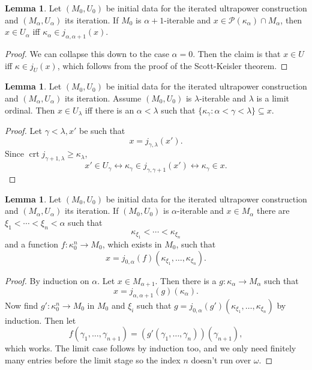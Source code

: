 \documentclass[12pt]{report}
\newcommand{\pset}{\mathcal{P}}
\renewcommand{\iff}{\leftrightarrow}
\DeclareMathOperator{\crt}{crt}
\theoremstyle{definition}
\newtheorem{lemma}[theorem]{Lemma}
\begin{document}
\begin{lemma}
Let $(M_0, U_0)$ be initial data for the iterated ultrapower construction and $(M_\alpha, U_\alpha)$ its iteration.
If $M_0$ is $\alpha + 1$-iterable and $x \in \pset(\kappa_\alpha) \cap M_\alpha$, then $x \in U_\alpha$ iff $\kappa_\alpha \in j_{\alpha,\alpha+1}(x)$.
\end{lemma}
\begin{proof}
We can collapse this down to the case $\alpha = 0$. Then the claim is that $x \in U$ iff $\kappa \in j_U(x)$, which follows from the proof of the Scott-Keisler theorem.
\end{proof}
\begin{lemma}
Let $(M_0, U_0)$ be initial data for the iterated ultrapower construction and $(M_\alpha, U_\alpha)$ its iteration. Assume $(M_0, U_0)$ is $\lambda$-iterable and $\lambda$ is a limit ordinal. Then $x \in U_\lambda$ iff there is an $\alpha < \lambda$ such that $\{\kappa_\gamma: \alpha < \gamma < \lambda\} \subseteq x$.
\end{lemma}
\begin{proof}
Let $\gamma < \lambda,x'$ be such that
$$x = j_{\gamma,\lambda}(x').$$
Since $\crt j_{\gamma + 1, \lambda} \geq \kappa_\lambda$,
$$x' \in U_\gamma \iff \kappa_\gamma \in j_{\gamma,\gamma + 1}(x') \iff \kappa_\gamma \in x.$$
\end{proof}
\begin{lemma}
\label{seed lemma}
Let $(M_0, U_0)$ be initial data for the iterated ultrapower construction and $(M_\alpha, U_\alpha)$ its iteration.
If $(M_0, U_0)$ is $\alpha$-iterable and $x \in M_\alpha$ there are $\xi_1 < \cdots < \xi_n < \alpha$ such that
$$\kappa_{\xi_1} < \cdots < \kappa_{\xi_n}$$
and a function $f: \kappa_0^n \to M_0$, which exists in $M_0$, such that
$$x = j_{0, \alpha}(f)(\kappa_{\xi_1}, \dots, \kappa_{\xi_n}).$$
\end{lemma}
\begin{proof}
By induction on $\alpha$. Let $x \in M_{\alpha + 1}$. Then there is a $g: \kappa_\alpha \to M_\alpha$ such that
$$x = j_{\alpha, \alpha + 1}(g)(\kappa_\alpha).$$
Now find $g': \kappa_0^n \to M_0$ in $M_0$ and $\xi_i$ such that $g = j_{0,\alpha}(g')(\kappa_{\xi_1}, \dots, \kappa_{\xi_n})$ by induction.
Then let
$$f(\gamma_1, \dots, \gamma_{n+1}) = (g'(\gamma_1, \dots, \gamma_n))(\gamma_{n+1}),$$
which works.
The limit case follows by induction too, and we only need finitely many entries before the limit stage so the index $n$ doesn't run over $\omega$.
\end{proof}
\end{document}

